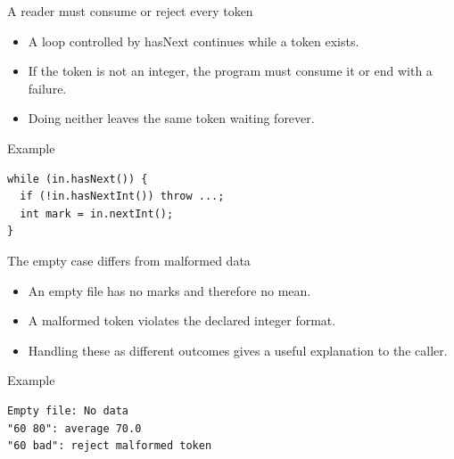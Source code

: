 \documentclass[10pt,aspectratio=169]{beamer}
\begin{document}
\begin{frame}[fragile,t]{A reader must consume or reject every token}
\begin{itemize}
\item A loop controlled by hasNext continues while a token exists.
\item If the token is not an integer, the program must consume it or end with a failure.
\item Doing neither leaves the same token waiting forever.
\end{itemize}
\vspace{1mm}\begin{block}{Example}
\begin{lstlisting}
while (in.hasNext()) {
  if (!in.hasNextInt()) throw ...;
  int mark = in.nextInt();
}
\end{lstlisting}
\end{block}
\end{frame}

\begin{frame}[fragile,t]{The empty case differs from malformed data}
\begin{itemize}
\item An empty file has no marks and therefore no mean.
\item A malformed token violates the declared integer format.
\item Handling these as different outcomes gives a useful explanation to the caller.
\end{itemize}
\vspace{1mm}\begin{block}{Example}
\begin{lstlisting}
Empty file: No data
"60 80": average 70.0
"60 bad": reject malformed token
\end{lstlisting}
\end{block}
\end{frame}
\end{document}
